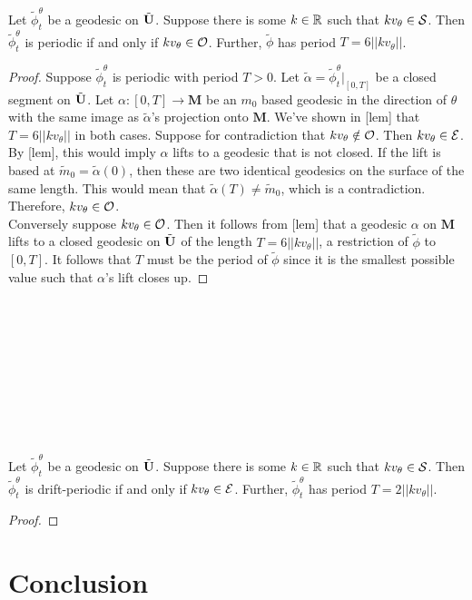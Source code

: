 \documentclass[a4paper, 11pt]{article}
\def\bM{\mathbf{M}}
\def\mtild{\tilde{m}_0}
\def\tildphi{\tilde{\phi}}
\begin{document}
\begin{thm}
Let $\tildphi_t^\theta$ be a geodesic on $\tilde{\mathbf{U}}$. Suppose there is some $k\in\mathbb{R}$ such that $kv_\theta\in\mathcal{S}$. Then $\tildphi_t^\theta$ is periodic if and only if $kv_\theta\in\mathcal{O}$. Further, $\tildphi$ has period $T=6||kv_\theta||$.
\begin{proof}
Suppose $\tildphi_t^\theta$ is periodic with period $T>0$. Let $\tilde{\alpha}=\tildphi_t^\theta\vert_{[0,T]}$ be a closed segment on $\tilde{\mathbf{U}}$. Let $\alpha:[0,T]\rightarrow\bM$ be an $m_0$ based geodesic in the direction of $\theta$ with the same image as $\tilde{\alpha}$'s projection onto $\bM$. We've shown in [lem] that $T=6||kv_\theta||$ in both cases. Suppose for contradiction that $kv_\theta\notin\mathcal{O}$. Then $kv_\theta\in\mathcal{E}$. By [lem], this would imply $\alpha$ lifts to a geodesic that is not closed. If the lift is based at $\mtild=\tilde{\alpha}(0)$, then these are two identical geodesics on the surface of the same length. This would mean that $\tilde{\alpha}(T)\neq \mtild$, which is a contradiction. Therefore, $kv_\theta\in\mathcal{O}$.\\
Conversely suppose $kv_\theta\in\mathcal{O}$. Then it follows from [lem] that a geodesic $\alpha$ on $\bM$ lifts to a closed geodesic on $\tilde{\mathbf{U}}$ of the length $T=6||kv_\theta||$, a restriction of $\tildphi$ to $[0,T]$. It follows that $T$ must be the period of $\tildphi$ since it is the smallest possible value such that $\alpha$'s lift closes up.  
\end{proof}
\end{thm}
~\\\\\\\\\\\\\\\\
\begin{thm}
Let $\tildphi_t^\theta$ be a geodesic on $\tilde{\mathbf{U}}$. Suppose there is some $k\in\mathbb{R}$ such that $kv_\theta\in\mathcal{S}$. Then $\tildphi_t^\theta$ is drift-periodic if and only if $kv_\theta\in\mathcal{E}$. Further, $\tildphi_t^\theta$ has period $T=2||kv_\theta||$.
\begin{proof}

\end{proof}
\end{thm}

\section{Conclusion}
\end{document}
